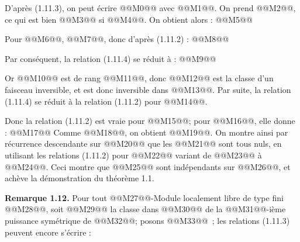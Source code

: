 
D'après (1.11.3), on
peut écrire
@@M0@@
avec @@M1@@. On prend @@M2@@, ce qui est bien @@M3@@ si @@M4@@. On obtient alors :
@@M5@@

Pour @@M6@@, @@M7@@, donc d'après (1.11.2) :
@@M8@@

Par conséquent, la relation (1.11.4) se réduit à :
@@M9@@

Or @@M10@@ est de rang @@M11@@, donc @@M12@@ est la classe d'un faisceau inversible, et est donc inversible dans @@M13@@. Par suite, la relation (1.11.4) se réduit à la relation (1.11.2) pour @@M14@@.

Donc la relation (1.11.2) est vraie pour @@M15@@; pour @@M16@@, elle donne :
@@M17@@
Comme @@M18@@, on obtient @@M19@@. On montre ainsi par récurrence descendante sur @@M20@@ que les @@M21@@ sont tous nuls, en utilisant les relations (1.11.2) pour @@M22@@ variant de @@M23@@ à @@M24@@. Ceci montre que @@M25@@ sont indépendants sur @@M26@@, et achève la démonstration du théorème 1.1.

\textbf{Remarque 1.12.} Pour tout @@M27@@-Module localement libre de type fini @@M28@@, soit @@M29@@ la classe dans @@M30@@ de la @@M31@@-ième puissance symétrique de @@M32@@; posons @@M33@@~; les relations (1.11.3) peuvent encore s'écrire :
